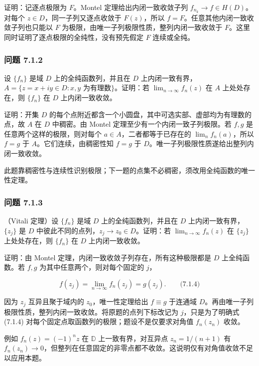 \documentclass[11pt,a4paper]{article}
\begin{document}
证明：记逐点极限为 \(F\)。Montel 定理给出内闭一致收敛子列
\(f_{n_k}\to f\in H(D)\)。对每个 \(z\in D\)，同一子列又逐点收敛于
\(F(z)\)，所以 \(f=F\)。任意其他内闭一致收敛子列也只能以 \(F\)
为极限，由唯一子列极限性质，整列内闭一致收敛于
\(F\)。这里同时证明了逐点极限的全纯性，没有预先假定 \(F\) 连续或全纯。

\subsubsection{问题 7.1.2}\label{ch07-s1-ux95eeux9898-712}

设 \(\{f_n\}\) 是域 \(D\) 上的全纯函数列，并且在 \(D\)
上内闭一致有界，\(A=\{z=x+iy\in D:x,y\text{ 为有理数}\}\)。证明：若
\(\lim_{n\to\infty}f_n(z)\) 在 \(A\) 上处处存在，则 \(\{f_n\}\) 在 \(D\)
上内闭一致收敛。

证明：开集 \(D\)
的每个点附近都含一个小圆盘，其中可选实部、虚部均为有理数的点，故 \(A\)
在 \(D\) 中稠密。由 Montel 定理至少有一个内闭一致子列极限。若 \(f,g\)
是任意两个这样的极限，则对每个 \(a\in A\)，二者都等于已存在的
\(\lim_n f_n(a)\)，所以 \(f=g\) 于 \(A\)。它们连续，由稠密性知 \(f=g\)
于 \(D\)。唯一子列极限性质遂给出整列内闭一致收敛。

此题靠稠密性与连续性识别极限；下一题的点集不必稠密，须改用全纯函数的唯一性定理。

\subsubsection{问题 7.1.3}\label{ch07-s1-ux95eeux9898-713}

（Vitali 定理）设 \(\{f_n\}\) 是域 \(D\) 上的全纯函数列，并且在 \(D\)
上内闭一致有界，\(\{z_j\}\) 是 \(D\)
中彼此不同的点列，\(z_j\to z_0\in D\)。证明：若
\(\lim_{n\to\infty}f_n(z)\) 在 \(\{z_j\}\) 上处处存在，则 \(\{f_n\}\) 在
\(D\) 上内闭一致收敛。

证明：由 Montel 定理，内闭一致收敛子列存在，所有这种极限都是 \(D\)
上全纯函数。若 \(f,g\) 为其中任意两个，则对每个固定的 \(j\)，

\[
f(z_j)=\lim_{n\to\infty}f_n(z_j)=g(z_j).
\qquad\text{(7.1.4)}
\]

因为 \(z_j\) 互异且聚于域内的 \(z_0\)，唯一性定理给出 \(f\equiv g\)
于连通域
\(D\)。再由唯一子列极限性质，整列内闭一致收敛。将原题的点列下标改记为
\(j\)，只是为了明确式 (7.1.4)
对每个固定点取函数列的极限；题设不是仅要求对角值 \(f_n(z_n)\) 收敛。

例如 \(f_n(z)=(-1)^n z\) 在 \(\mathbb D\) 上一致有界，对互异点
\(z_n=1/(n+1)\) 有
\(f_n(z_n)\to0\)，但整列在任意固定的非零点都不收敛。这说明仅有对角值收敛不足以应用本题。
\end{document}
